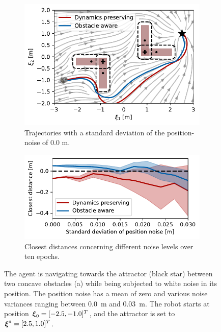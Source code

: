 \begin{figure}[htbp]
    \centering
    \begin{subfigure}{\columnwidth}
      \centerline{\includegraphics[width=\textwidth]{figures/trajectory_position_noise}}
      \caption{Trajectories with a standard deviation of the position-noise of 0.0 m.}
      \label{fig:trajectory_position_noise}
    \end{subfigure}
    \begin{subfigure}{\columnwidth}
    \includegraphics[width=\textwidth]{figures/comparison_position_noise}
      \caption{Closest distances concerning different noise levels over ten epochs.}
      \label{fig:comparison_position_noise}
    \end{subfigure}
	\caption{
 The agent is navigating towards the attractor (black star) between two concave obstacles (a) while being subjected to white noise in its position. The position noise has a mean of zero and various noise variances ranging between \qty{0.0}{m} and \qty{0.03}{m}. The robot starts at position $\boldsymbol{\xi}_0 = [-2.5, -1.0]^T$, and the attractor is set to $\boldsymbol{\xi}^a = [2.5, 1.0]^T$.
 }
\label{fig:position_noise}
\end{figure}
\fi

